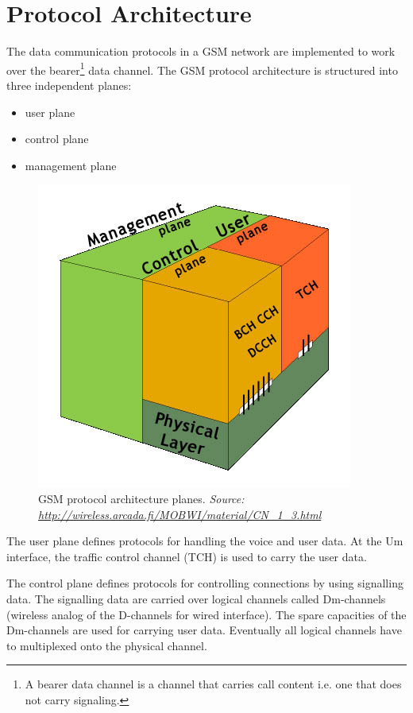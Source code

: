 \section{Protocol Architecture}
The data communication protocols in a GSM network are implemented to work over the bearer\footnote{A bearer data channel is a channel that carries call content i.e.
one that does not carry signaling.} data channel. 
The GSM protocol architecture is structured into three independent planes:
\begin{itemize}
 \item user plane
 \item control plane
 \item management plane
\end{itemize}
\begin{figure}
\centering
\includegraphics[scale=0.7]{gsmPlanes}
\caption[GSM protocol architecture planes]{GSM protocol architecture planes.
\emph{Source: \url{http://wireless.arcada.fi/MOBWI/material/CN\_1\_3.html}}}
\end{figure}

The user plane defines protocols for handling the voice and user data. 
At the Um interface, the traffic control channel (TCH) is used to carry the user data.


The control plane defines protocols for controlling connections by using signalling data.
The signalling data are carried over logical channels called Dm-channels (wireless analog of the D-channels for wired interface).
The spare capacities of the Dm-channels are used for carrying user data.
Eventually all logical channels have to multiplexed onto the physical channel.


